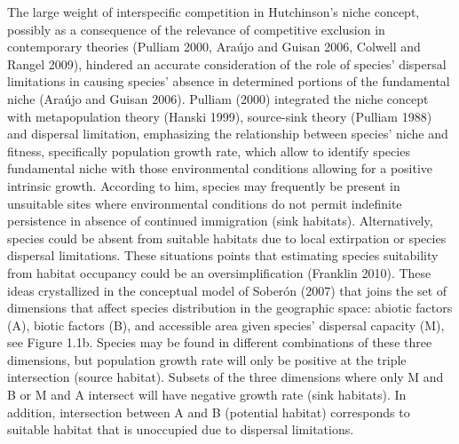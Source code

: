 \documentclass[11pt,twoside]{reedthesis}
\begin{document}
The large weight of interspecific competition in Hutchinson's niche
concept, possibly as a consequence of the relevance of competitive
exclusion in contemporary theories (Pulliam 2000, Araújo and Guisan
2006, Colwell and Rangel 2009), hindered an accurate consideration of
the role of species' dispersal limitations in causing species' absence
in determined portions of the fundamental niche (Araújo and Guisan
2006). Pulliam (2000) integrated the niche concept with metapopulation
theory (Hanski 1999), source-sink theory (Pulliam 1988) and dispersal
limitation, emphasizing the relationship between species' niche and
fitness, specifically population growth rate, which allow to identify
species fundamental niche with those environmental conditions allowing
for a positive intrinsic growth. According to him, species may
frequently be present in unsuitable sites where environmental conditions
do not permit indefinite persistence in absence of continued immigration
(sink habitats). Alternatively, species could be absent from suitable
habitats due to local extirpation or species dispersal limitations.
These situations points that estimating species suitability from habitat
occupancy could be an oversimplification (Franklin 2010). These ideas
crystallized in the conceptual model of Soberón (2007) that joins the
set of dimensions that affect species distribution in the geographic
space: abiotic factors (A), biotic factors (B), and accessible area
given species' dispersal capacity (M), see Figure 1.1b. Species may be
found in different combinations of these three dimensions, but
population growth rate will only be positive at the triple intersection
(source habitat). Subsets of the three dimensions where only M and B or
M and A intersect will have negative growth rate (sink habitats). In
addition, intersection between A and B (potential habitat) corresponds
to suitable habitat that is unoccupied due to dispersal limitations.\par
\end{document}
